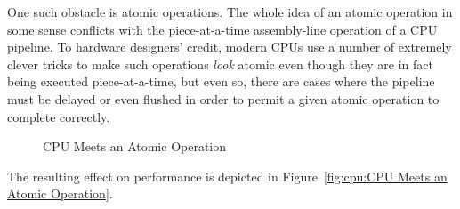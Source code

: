 One such obstacle is atomic operations.
The whole idea of an atomic operation in some sense conflicts with
the piece-at-a-time assembly-line operation of a CPU pipeline.
To hardware designers' credit, modern CPUs use a number of extremely clever
tricks to make such operations \emph{look} atomic even though they
are in fact being executed piece-at-a-time, but even so, there are
cases where the pipeline must be delayed or even flushed in order to
permit a given atomic operation to complete correctly.

\begin{figure}[htb]
\begin{center}
\end{center}
\caption{CPU Meets an Atomic Operation}
\end{figure}

The resulting effect on performance is depicted in
Figure~\ref{fig:cpu:CPU Meets an Atomic Operation}.

